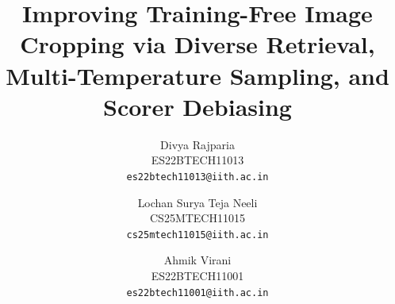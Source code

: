 \documentclass[10pt,twocolumn,letterpaper]{article}
\title{Improving Training-Free Image Cropping via Diverse Retrieval, Multi-Temperature Sampling, and Scorer Debiasing}
\author{Divya Rajparia\\
ES22BTECH11013\\
{\tt\small es22btech11013@iith.ac.in}
\and
Lochan Surya Teja Neeli\\
CS25MTECH11015\\
{\tt\small cs25mtech11015@iith.ac.in}
\and
Ahmik Virani\\
ES22BTECH11001\\
{\tt\small es22btech11001@iith.ac.in}
}
\begin{document}
\maketitle









{
    \small
    
    
}
\end{document}
